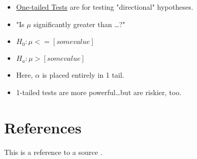 \documentclass[11pt]{report}
\begin{document}
\begin{itemize}
    \item \underline{One-tailed Tests} are for testing "directional" hypotheses.
    \item "Is $\mu$ significantly greater than \dots?"
    \item $H_0: \mu <= [some value]$
    \item $H_a: \mu > [some value]$
    \item Here, $\alpha$ is placed entirely in 1 tail.
    \item 1-tailed tests are more powerful\dots but are riskier, too.
\end{itemize}

\section{References}
This is a reference to a source \cite{example}.



\end{document}
